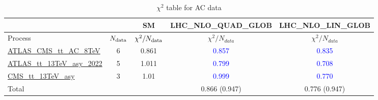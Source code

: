 \documentclass{article}
\begin{document}
\begin{table}[H]
\centering
\begin{tabular}{|l|c|c|c|c|}
\hline
 \multicolumn{2}{|c|}{} & SM& LHC_NLO_QUAD_GLOB& LHC_NLO_LIN_GLOB\\ \hline
Process & $N_{\rm data}$ & $\chi^ 2/N_{\rm data}$& $\chi^ 2/N_{data}$& $\chi^ 2/N_{data}$\\ \hline
\href{https://arxiv.org}{ATLAS_CMS_tt_AC_8TeV} & 6 & 0.861 & \textcolor{blue}                            {0.857} & \textcolor{blue}                            {0.835} \\ \hline
\href{https://arxiv.org}{ATLAS_tt_13TeV_asy_2022} & 5 & 1.011 & \textcolor{blue}                            {0.799} & \textcolor{blue}                            {0.708} \\ \hline
\href{https://arxiv.org}{CMS_tt_13TeV_asy} & 3 & 1.01 & \textcolor{blue}                            {0.999} & \textcolor{blue}                            {0.770} \\ \hline
\hline Total & &  & 0.866 (0.947) & 0.776 (0.947) \\ \hline
\end{tabular}
\caption{$\chi^2$ table for AC data}
\end{table}
\end{document}
